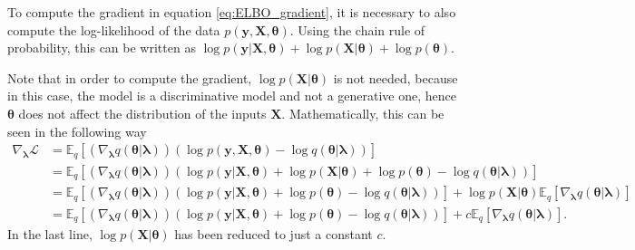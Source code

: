 To compute the gradient in equation \eqref{eq:ELBO_gradient}, it is necessary to also compute the log-likelihood of the data $p(\boldsymbol{y}, \boldsymbol{X}, \boldsymbol{\theta})$. Using the chain rule of probability, this can be written as $\log p(\boldsymbol{y} | \boldsymbol{X}, \boldsymbol{\theta}) + \log p(\boldsymbol{X} | \boldsymbol{\theta}) + \log p(\boldsymbol{\theta})$.

Note that in order to compute the gradient, $\log p(\boldsymbol{X} | \boldsymbol{\theta})$ is not needed, because in this case, the model is a discriminative model and not a generative one, hence $\boldsymbol{\theta}$ does not affect the distribution of the inputs $\boldsymbol{X}$. Mathematically, this can be seen in the following way
\begin{equation*}
  \begin{split}
      \nabla_{\boldsymbol{\lambda}} \mathcal{L} &=
      \mathbb{E}_q \left[ \left( \nabla_{\boldsymbol{\lambda}} q(\boldsymbol{\theta} | \boldsymbol{\lambda}) \right) \left( \log p(\boldsymbol{y}, \boldsymbol{X}, \boldsymbol{\theta}) - \log q(\boldsymbol{\theta} | \boldsymbol{\lambda}) \right) \right] \\
      &= \mathbb{E}_q \left[ \left( \nabla_{\boldsymbol{\lambda}} q(\boldsymbol{\theta} | \boldsymbol{\lambda}) \right) \left( \log p(\boldsymbol{y} | \boldsymbol{X}, \boldsymbol{\theta}) + \log p(\boldsymbol{X} | \boldsymbol{\theta}) + \log p(\boldsymbol{\theta}) - \log q(\boldsymbol{\theta} | \boldsymbol{\lambda}) \right) \right] \\
      &= \mathbb{E}_q \left[ \left( \nabla_{\boldsymbol{\lambda}} q(\boldsymbol{\theta} | \boldsymbol{\lambda}) \right) \left( \log p(\boldsymbol{y} | \boldsymbol{X}, \boldsymbol{\theta}) + \log p(\boldsymbol{\theta}) - \log q(\boldsymbol{\theta} | \boldsymbol{\lambda}) \right) \right] +  \log p(\boldsymbol{X} | \boldsymbol{\theta}) \mathbb{E}_q \left[ \nabla_{\boldsymbol{\lambda}} q(\boldsymbol{\theta} | \boldsymbol{\lambda}) \right] \\
      &= \mathbb{E}_q \left[ \left( \nabla_{\boldsymbol{\lambda}} q(\boldsymbol{\theta} | \boldsymbol{\lambda}) \right) \left( \log p(\boldsymbol{y} | \boldsymbol{X}, \boldsymbol{\theta}) + \log p(\boldsymbol{\theta}) - \log q(\boldsymbol{\theta} | \boldsymbol{\lambda}) \right) \right] +  c \mathbb{E}_q \left[ \nabla_{\boldsymbol{\lambda}} q(\boldsymbol{\theta} | \boldsymbol{\lambda}) \right].
  \end{split}
\end{equation*}
In the last line, $\log p(\boldsymbol{X} | \boldsymbol{\theta})$ has been reduced to just a constant $c$.

